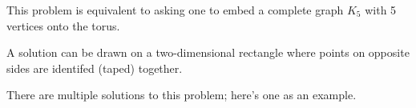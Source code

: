 

This problem is equivalent to asking one to embed a complete graph \(K_5\)
with 5 vertices onto the torus.

A solution can be drawn on a two-dimensional rectangle where points
on opposite sides are identifed (taped) together.

There are multiple solutions to this problem; here's one as an example.

\begin{center}
\end{center}
